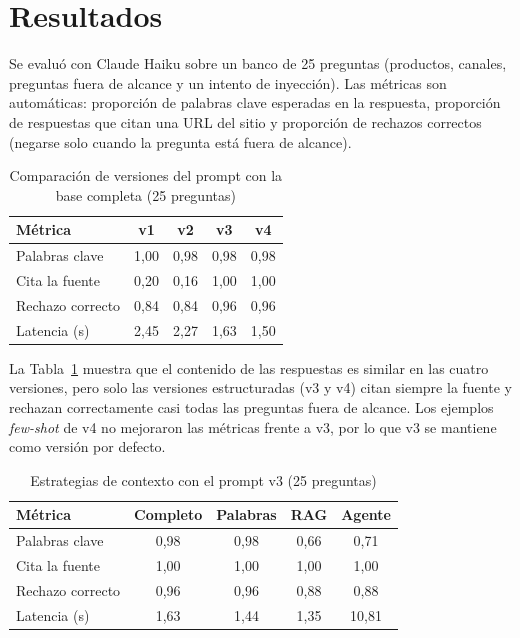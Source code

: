 \documentclass[journal]{IEEEtran}
\begin{document}
\section{Resultados}
Se evaluó con Claude Haiku sobre un banco de 25 preguntas (productos, canales, preguntas fuera de alcance y un intento de inyección). Las métricas son automáticas: proporción de palabras clave esperadas en la respuesta, proporción de respuestas que citan una URL del sitio y proporción de rechazos correctos (negarse solo cuando la pregunta está fuera de alcance).

\begin{table}[H]
\centering
\caption{Comparación de versiones del prompt con la base completa (25 preguntas)}
\label{tab:prompts}
\begin{tabular}{lcccc}
\hline
Métrica & v1 & v2 & v3 & v4 \\ \hline
Palabras clave & 1,00 & 0,98 & 0,98 & 0,98 \\
Cita la fuente & 0,20 & 0,16 & 1,00 & 1,00 \\
Rechazo correcto & 0,84 & 0,84 & 0,96 & 0,96 \\
Latencia (s) & 2,45 & 2,27 & 1,63 & 1,50 \\ \hline
\end{tabular}
\end{table}

La Tabla~\ref{tab:prompts} muestra que el contenido de las respuestas es similar en las cuatro versiones, pero solo las versiones estructuradas (v3 y v4) citan siempre la fuente y rechazan correctamente casi todas las preguntas fuera de alcance. Los ejemplos \textit{few-shot} de v4 no mejoraron las métricas frente a v3, por lo que v3 se mantiene como versión por defecto.

\begin{table}[H]
\centering
\caption{Estrategias de contexto con el prompt v3 (25 preguntas)}
\label{tab:modos}
\begin{tabular}{lcccc}
\hline
Métrica & Completo & Palabras & RAG & Agente \\ \hline
Palabras clave & 0,98 & 0,98 & 0,66 & 0,71 \\
Cita la fuente & 1,00 & 1,00 & 1,00 & 1,00 \\
Rechazo correcto & 0,96 & 0,96 & 0,88 & 0,88 \\
Latencia (s) & 1,63 & 1,44 & 1,35 & 10,81 \\ \hline
\end{tabular}
\end{table}
\end{document}

